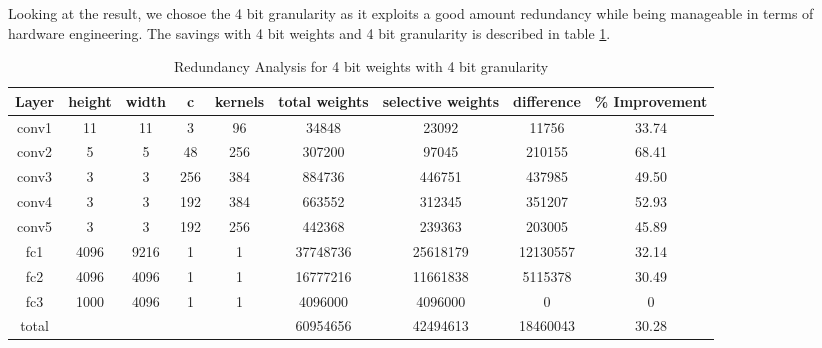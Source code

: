 \documentclass[conference]{IEEEtran}
\begin{document}
Looking at the result, we chosoe the 4 bit granularity as it exploits a good amount redundancy while being manageable in terms of hardware engineering. The savings with 4 bit weights and 4 bit granularity is described in table \ref{Red_Anal}.

\begin{table}[!ht]
\centering
\caption{Redundancy Analysis for 4 bit weights with 4 bit granularity}
\label{Red_Anal}
\begin{tabular}{ccccccccc}
\hline
Layer & height    & width    & c   & kernels & total weights & selective weights  & difference & \% Improvement \\ \hline
conv1 & 11   & 11   & 3   & 96      & 34848         & 23092             & 11756      & 33.74          \\
conv2 & 5    & 5    & 48  & 256     & 307200        & 97045             & 210155     & 68.41          \\
conv3 & 3    & 3    & 256 & 384     & 884736        & 446751            & 437985     & 49.50          \\
conv4 & 3    & 3    & 192 & 384     & 663552        & 312345             & 351207     & 52.93          \\
conv5 & 3    & 3    & 192 & 256     & 442368        & 239363             & 203005     & 45.89          \\
fc1   & 4096 & 9216 & 1   & 1       & 37748736      & 25618179         & 12130557   & 32.14          \\
fc2   & 4096 & 4096 & 1   & 1       & 16777216      & 11661838          & 5115378    & 30.49          \\
fc3   & 1000 & 4096 & 1   & 1       & 4096000       & 4096000           & 0          & 0              \\ \hline
total &      &      &     &         & 60954656      & 42494613          & 18460043   & 30.28          \\ \hline
\end{tabular}
\end{table}
\end{document}
